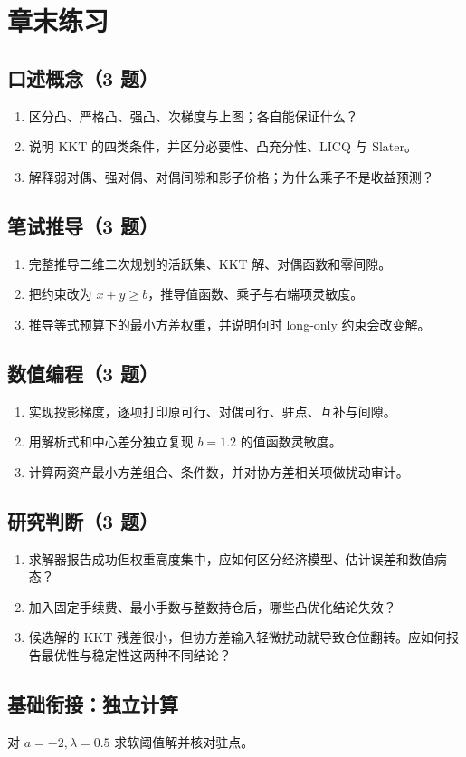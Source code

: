 \section*{章末练习}
\begingroup\small
\subsection*{口述概念（3 题）}
\begin{enumerate}[nosep,leftmargin=*]
\item 区分凸、严格凸、强凸、次梯度与上图；各自能保证什么？
\item 说明 KKT 的四类条件，并区分必要性、凸充分性、LICQ 与 Slater。
\item 解释弱对偶、强对偶、对偶间隙和影子价格；为什么乘子不是收益预测？
\end{enumerate}
\subsection*{笔试推导（3 题）}
\begin{enumerate}[nosep,leftmargin=*,start=4]
\item 完整推导二维二次规划的活跃集、KKT 解、对偶函数和零间隙。
\item 把约束改为 $x+y\ge b$，推导值函数、乘子与右端项灵敏度。
\item 推导等式预算下的最小方差权重，并说明何时 long-only 约束会改变解。
\end{enumerate}
\subsection*{数值编程（3 题）}
\begin{enumerate}[nosep,leftmargin=*,start=7]
\item 实现投影梯度，逐项打印原可行、对偶可行、驻点、互补与间隙。
\item 用解析式和中心差分独立复现 $b=1.2$ 的值函数灵敏度。
\item 计算两资产最小方差组合、条件数，并对协方差相关项做扰动审计。
\end{enumerate}
\subsection*{研究判断（3 题）}
\begin{enumerate}[nosep,leftmargin=*,start=10]
\item 求解器报告成功但权重高度集中，应如何区分经济模型、估计误差和数值病态？
\item 加入固定手续费、最小手数与整数持仓后，哪些凸优化结论失效？
\item 候选解的 KKT 残差很小，但协方差输入轻微扰动就导致仓位翻转。应如何报告最优性与稳定性这两种不同结论？
\end{enumerate}
\endgroup


\MFQMappedUpperThirteenQuestions

\subsection*{基础衔接：独立计算}
对 $a=-2,\lambda=0.5$ 求软阈值解并核对驻点。
